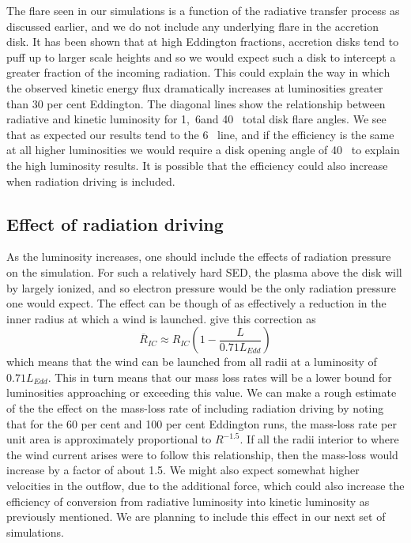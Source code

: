 \documentclass[a4paper,fleqn,usenatbib]{mnras}
\begin{document}
The flare seen in our simulations is a function of the radiative transfer process as discussed earlier, and we 
do not include any underlying flare in the accretion disk. It has been shown that at high Eddington fractions,
accretion disks tend to puff up to larger scale heights \citep[][but also see \citealt{2016A&A...587A..13L}]{1988ApJ...332..646A,2005MNRAS.357..295O} and so we would
expect such a disk to intercept a greater fraction of the incoming radiation. This could explain the way in which 
the observed kinetic energy flux dramatically increases at luminosities greater than 30 per cent Eddington. The
diagonal lines show the relationship between radiative and kinetic luminosity for 1\degree,~6\degree and 40\degree~
total disk flare angles. We see that as expected our results tend to the 6\degree~ line, and if the efficiency is 
the same at all higher luminosities we would require a disk opening angle of 40\degree~ to explain the high 
luminosity results. It is possible that the efficiency could also increase when radiation driving is included.


\subsection{Effect of radiation driving}

As the luminosity increases, one should include the effects
of radiation pressure on the simulation. For such a relatively hard SED, 
the plasma above the disk will by largely ionized, and so electron
pressure would be the only radiation pressure one would expect. The 
effect can be though of as effectively a reduction in the inner radius
at which a wind is launched. \cite{2018MNRAS.473..838D} give this 
correction as
\begin{equation}
\overline{R}_{IC}\approx R_{IC}\left(1-\frac{L}{0.71L_{Edd}}\right)
\end{equation}
which means that the wind can be launched from all radii at a luminosity
of $0.71 L_{Edd}$. This in turn means that our mass loss rates will be a lower 
bound for luminosities approaching or exceeding this value. We can make a rough
estimate of the the effect on the mass-loss rate of including radiation driving by
noting that for the 60 per cent and 100 per cent Eddington runs, the mass-loss
rate per unit area is approximately proportional to $R^{-1.5}$. If all the radii
interior to where the wind current arises were to follow this relationship, then the 
mass-loss would increase by a factor of about 1.5. 
We might also 
expect somewhat higher velocities in the outflow, due to the additional force, which could also
increase the efficiency of conversion from radiative luminosity into kinetic luminosity as previously
mentioned. 
We are planning to include this effect in our next set of simulations.
\end{document}

